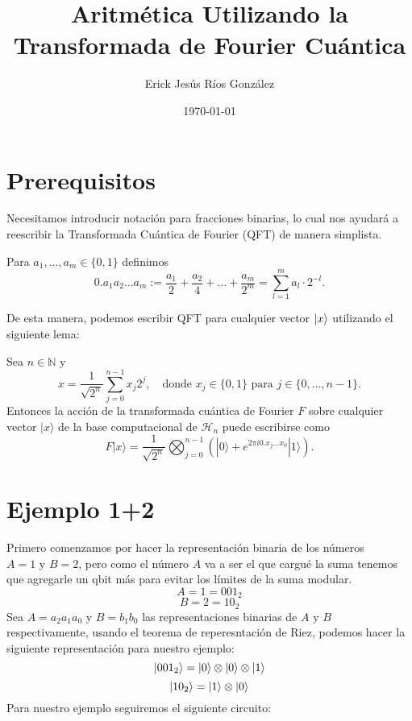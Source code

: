 \documentclass{article}
\title{Aritmética Utilizando la Transformada de Fourier Cuántica}
\author{Erick Jesús Ríos González}
\date{\today}
\begin{document}
\maketitle
\section{Prerequisitos}
\noindent Necesitamos introducir notación para fracciones binarias,
lo cual nos ayudará a reescribir la Transformada Cuántica de Fourier (QFT)
de manera simplista.
\begin{mydef}{}{}
    Para $a_1, \ldots, a_m \in \{0, 1\}$ definimos
\[
0.a_1a_2 \ldots a_m := \frac{a_1}{2} + \frac{a_2}{4} + \ldots + \frac{a_m}{2^m} =
\sum_{l=1}^{m} a_l \cdot 2^{-l}.
\]
\end{mydef}
De esta manera, podemos escribir QFT para cualquier vector \(\ket{x}\) utilizando el 
siguiente lema:
\begin{mylem}{}{}
    Sea $n \in \mathbb{N}$ y
    \[
    x = \frac{1}{\sqrt{2^n}} \sum_{j=0}^{n-1} x_j 2^j, \quad \text{donde } x_j \in \{0, 1\} \text{ para } j \in \{0, \ldots, n-1\}.
    \]
    Entonces la acción de la transformada cuántica de Fourier $F$ sobre cualquier vector $|x\rangle$ de la base computacional de $\mathcal{H}_n$ puede escribirse como
    \[
    F|x\rangle = \frac{1}{\sqrt{2^n}} \bigotimes_{j=0}^{n-1} \left( |0\rangle + e^{2\pi i 0.x_j \ldots x_0} |1\rangle \right).
    \]
\end{mylem}
\section{Ejemplo 1+2}
Primero comenzamos por hacer la representación binaria de los números
\(A = 1 \text{ y } B=2 \), pero como el número \(A\) va a ser el que cargué la suma
tenemos que agregarle un qbit más para evitar los límites de la suma modular.
\[A = 1 = 001_2\]
\[B=2=10_2\]
Sea \(A=a_{2}a_{1}a_{0}\) y \(B=b_1b_0\) las representaciones binarias de \(A \text{ y } B\)
respectivamente, usando el teorema de reperesntación de Riez, podemos hacer la siguiente representación
para nuestro ejemplo:
\[\ket{001_2}= \ket{0}\otimes\ket{0}\otimes\ket{1}\]
 \[\ket{10_2}=\ket{1}\otimes\ket{0}\]
Para nuestro ejemplo seguiremos el siguiente circuito:
\end{document}

